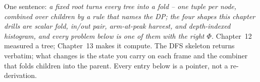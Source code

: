 

One sentence: \emph{a fixed root turns every tree into a fold -- one tuple
per node, combined over children by a rule that names the DP; the four
shapes this chapter drills are scalar fold, in/out pair, arm-at-peak
harvest, and depth-indexed histogram, and every problem below is one of
them with the right $\Phi$.} Chapter~12 measured a tree; Chapter~13 makes
it compute. The DFS skeleton  returns verbatim; what
changes is the state you carry on each frame and the combiner that folds
children into the parent. Every entry below is a pointer, not a
re-derivation.

